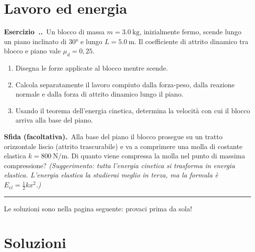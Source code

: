 \documentclass[11pt,a4paper]{article}
\newcommand{\es}{\refstepcounter{esnum}\medskip\noindent\textbf{Esercizio~\theesnum.}\ }
\newcounter{esnum}[section]
\renewcommand{\theesnum}{\thesection.\arabic{esnum}}
\begin{document}
\begin{center}
\end{center}

\section{Lavoro ed energia}

\es Un blocco di massa $m = \SI{3,0}{\kilo\gram}$, inizialmente fermo, scende lungo un piano
inclinato di $\ang{30}$ e lungo $L = \SI{5,0}{\meter}$. Il coefficiente di attrito dinamico tra
blocco e piano vale $\mu_d = 0{,}25$.
\begin{enumerate}[label=\alph*)]
  \item Disegna le forze applicate al blocco mentre scende.
  \item Calcola separatamente il lavoro compiuto dalla forza-peso, dalla reazione normale e dalla
        forza di attrito dinamico lungo il piano.
  \item Usando il teorema dell'energia cinetica, determina la velocità con cui il blocco arriva
        alla base del piano.
\end{enumerate}

\medskip
\noindent\textbf{Sfida (facoltativa).}\ Alla base del piano il blocco prosegue su un tratto
orizzontale liscio (attrito trascurabile) e va a comprimere una molla di costante elastica
$k = \SI{800}{\newton\per\meter}$. Di quanto viene compressa la molla nel punto di massima
compressione? \emph{(Suggerimento: tutta l'energia cinetica si trasforma in energia elastica.
L'energia elastica la studierai meglio in terza, ma la formula è $E_{el}=\tfrac{1}{2}kx^2$.)}

\vfill
\noindent\rule{\textwidth}{0.4pt}
\begin{center}\small Le soluzioni sono nella pagina seguente: provaci prima da sola!\end{center}

\newpage
\begingroup
\color{blu}\section*{\color{blu}Soluzioni}
\endgroup
\setcounter{section}{0}
\renewcommand{\theesnum}{\thesection.\arabic{esnum}}
\end{document}
